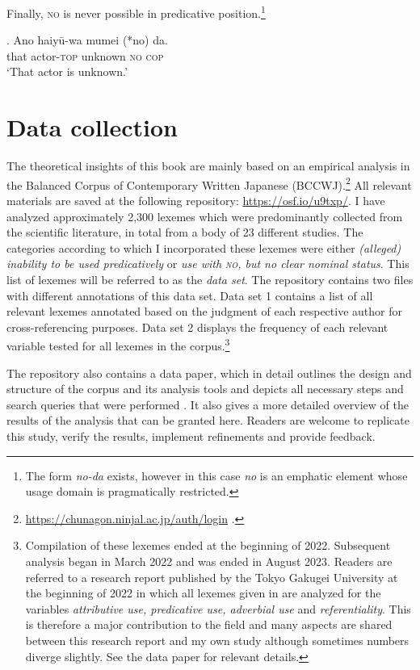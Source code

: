 \largerpage[2]
Finally, \textsc{no} is never possible in predicative position.\footnote{The form \textit{no-da} exists, however in this case \textit{no} is an emphatic element whose usage domain is pragmatically restricted.}

\exg. Ano haiyū-wa mumei (*no) da.\\
that actor-\textsc{top} unknown \textsc{no} \textsc{cop}\\
`That actor is unknown.’

\clearpage
\section{Data collection} \label{corpusanalysis}

The theoretical insights of this book are mainly based on an empirical analysis in the Balanced Corpus of Contemporary Written Japanese (BCCWJ).\footnote{\url{https://chunagon.ninjal.ac.jp/auth/login} \citep{maekawa:2014:bccwj}.} All relevant materials are saved at the following repository: \url{https://osf.io/u9txp/}. I have analyzed approximately 2,300 lexemes which were predominantly collected from the scientific literature, in total from a body of 23 different studies. The categories according to which I incorporated these lexemes were either \textit{(alleged) inability to be used predicatively} or \textit{use with \textsc{no}, but no clear nominal status}. This list of lexemes will be referred to as the \textit{data set}. The repository contains two files with different annotations of this data set. Data set 1 contains a list of all relevant lexemes annotated based on the judgment of each respective author for cross-referencing purposes. Data set 2 displays the frequency of each relevant variable tested for all lexemes in the corpus.\footnote{Compilation of these lexemes ended at the beginning of 2022. Subsequent analysis began in March 2022 and was ended in August 2023. Readers are referred to a research report published by the Tokyo Gakugei University at the beginning of 2022 \citep{abe:2022:no} in which all lexemes given in \citet{muraki:2012:nihongo} are analyzed for the variables \textit{attributive use, predicative use, adverbial use} and \textit{referentiality}. This is therefore a major contribution to the field and many aspects are shared between this research report and my own study although sometimes numbers diverge slightly. See the data paper for relevant details.}

The repository also contains a data paper, which in detail outlines the design and structure of the corpus and its analysis tools and depicts all necessary steps and search queries that were performed \citep{kohlich:2023:suppl}. It also gives a more detailed overview of the results of the analysis that can be granted here. Readers are welcome to replicate this study, verify the results, implement refinements and provide feedback.

